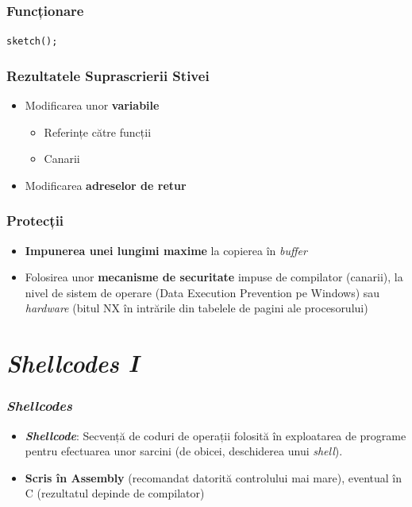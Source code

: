 \documentclass[xcolor={table}]{beamer}
\begin{document}
	\begin{frame}
		\frametitle{Funcționare}\pause
		\centering
        \texttt{sketch();}
	\end{frame}
	
	\begin{frame}
		\frametitle{Rezultatele Suprascrierii Stivei}\pause
		\begin{itemize}[<+->]
			\item Modificarea unor \textbf{variabile}
			    \begin{itemize}
        			\item Referințe către funcții
        			\item Canarii
        		\end{itemize}
        	\item Modificarea \textbf{adreselor de retur}
		\end{itemize}
	\end{frame}
	
	\begin{frame}
		\frametitle{Protecții}\pause
		\begin{itemize}[<+->]
			\item \textbf{Impunerea unei lungimi maxime} la copierea în \textit{buffer}
			\item Folosirea unor \textbf{mecanisme de securitate} impuse de compilator (canarii), la nivel de sistem de operare (Data Execution Prevention pe Windows) sau \textit{hardware} (bitul NX în intrările din tabelele de pagini ale procesorului)
		\end{itemize}
	\end{frame}
	
	\section{\textit{Shellcodes I}}

	\begin{frame}
		\frametitle{\textit{Shellcodes}}\pause
		\begin{itemize}[<+->]
			\item \textbf{\textit{Shellcode}}: Secvență de coduri de operații folosită în exploatarea de programe pentru efectuarea unor sarcini (de obicei, deschiderea unui \textit{shell}).
			\item \textbf{Scris în Assembly} (recomandat datorită controlului mai mare), eventual în C (rezultatul depinde de compilator)
		\end{itemize}
	\end{frame}
	
\end{document}
